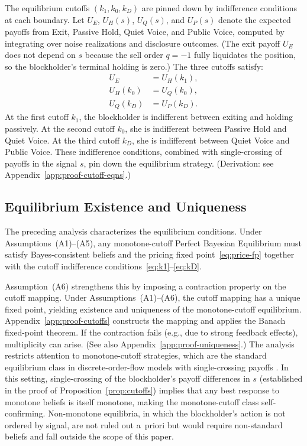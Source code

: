 \documentclass[11pt]{article}
\newcommand{\1}{\mathbf{1}}
\begin{document}
The equilibrium cutoffs $(k_1,k_0,k_D)$ are pinned down by indifference conditions at each boundary. Let $U_E$, $U_H(s)$, $U_Q(s)$, and $U_P(s)$ denote the expected payoffs from Exit, Passive Hold, Quiet Voice, and Public Voice, computed by integrating over noise realizations and disclosure outcomes. (The exit payoff $U_E$ does not depend on $s$ because the sell order $q=-1$ fully liquidates the position, so the blockholder's terminal holding is zero.) The three cutoffs satisfy:
\begin{align}
U_E &= U_H(k_1), \label{eq:k1} \\
U_H(k_0) &= U_Q(k_0), \label{eq:k0} \\
U_Q(k_D) &= U_P(k_D). \label{eq:kD}
\end{align}
At the first cutoff $k_1$, the blockholder is indifferent between exiting and holding passively. At the second cutoff $k_0$, she is indifferent between Passive Hold and Quiet Voice. At the third cutoff $k_D$, she is indifferent between Quiet Voice and Public Voice. These indifference conditions, combined with single-crossing of payoffs in the signal $s$, pin down the equilibrium strategy. (Derivation: see Appendix~\ref{app:proof-cutoff-eqns}.)

\subsection{Equilibrium Existence and Uniqueness}

The preceding analysis characterizes the equilibrium conditions. Under Assumptions~\textup{(A1)}--\textup{(A5)}, any monotone-cutoff Perfect Bayesian Equilibrium must satisfy Bayes-consistent beliefs and the pricing fixed point~\eqref{eq:price-fp} together with the cutoff indifference conditions~\eqref{eq:k1}--\eqref{eq:kD}.

Assumption~\textup{(A6)} strengthens this by imposing a contraction property on the cutoff mapping. Under Assumptions~\textup{(A1)}--\textup{(A6)}, the cutoff mapping has a unique fixed point, yielding existence and uniqueness of the monotone-cutoff equilibrium. Appendix~\ref{app:proof-cutoffs} constructs the mapping and applies the Banach fixed-point theorem. If the contraction fails (e.g., due to strong feedback effects), multiplicity can arise. (See also Appendix~\ref{app:proof-uniqueness}.) The analysis restricts attention to monotone-cutoff strategies, which are the standard equilibrium class in discrete-order-flow models with single-crossing payoffs \citep{EdmansGoldsteinJiang2015,EdmansGoldsteinJiang2012}. In this setting, single-crossing of the blockholder's payoff differences in $s$ (established in the proof of Proposition~\ref{prop:cutoffs}) implies that any best response to monotone beliefs is itself monotone, making the monotone-cutoff class self-confirming. Non-monotone equilibria, in which the blockholder's action is not ordered by signal, are not ruled out a~priori but would require non-standard beliefs and fall outside the scope of this paper.
\end{document}
